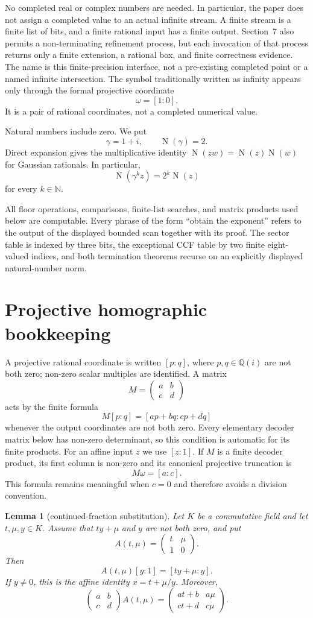 \documentclass[10pt]{article}
\newtheorem{lemma}[theorem]{Lemma}
\theoremstyle{definition}
\theoremstyle{remark}
\newcommand{\N}{\mathbb{N}}
\newcommand{\Qi}{\mathbb{Q}(i)}
\newcommand{\Norm}{\operatorname{N}}
\newcommand{\Proj}[2]{[#1:#2]}
\newcommand{\mat}[4]{\begin{pmatrix}#1&#2\\#3&#4\end{pmatrix}}
\begin{document}
No completed real or complex numbers are needed.  In particular, the paper does not assign a completed value to an actual infinite stream.  A finite stream is a finite list of bits, and a finite rational input has a finite output.  Section~7 also permits a non-terminating refinement process, but each invocation of that process returns only a finite extension, a rational box, and finite correctness evidence.  The name is this finite-precision interface, not a pre-existing completed point or a named infinite intersection.  The symbol traditionally written as infinity appears only through the formal projective coordinate
\[
 \omega=\Proj{1}{0}.
\]
It is a pair of rational coordinates, not a completed numerical value.

Natural numbers include zero.  We put
\[
 \gamma=1+i,\qquad \Norm(\gamma)=2.
\]
Direct expansion gives the multiplicative identity $\Norm(zw)=\Norm(z)\Norm(w)$ for Gaussian rationals.  In particular,
\[
 \Norm(\gamma^kz)=2^k\Norm(z)
\]
for every $k\in\N$.

All floor operations, comparisons, finite-list searches, and matrix products used below are computable.  Every phrase of the form ``obtain the exponent'' refers to the output of the displayed bounded scan together with its proof.  The sector table is indexed by three bits, the exceptional CCF table by two finite eight-valued indices, and both termination theorems recurse on an explicitly displayed natural-number norm.

\section{Projective homographic bookkeeping}

A projective rational coordinate is written $\Proj{p}{q}$, where $p,q\in\Qi$ are not both zero; non-zero scalar multiples are identified.  A matrix
\[
 M=\mat{a}{b}{c}{d}
\]
acts by the finite formula
\[
 M\Proj{p}{q}=\Proj{ap+bq}{cp+dq}
\]
whenever the output coordinates are not both zero.  Every elementary decoder matrix below has non-zero determinant, so this condition is automatic for its finite products.  For an affine input $z$ we use $\Proj{z}{1}$.  If $M$ is a finite decoder product, its first column is non-zero and its canonical projective truncation is
\[
 M\omega=\Proj{a}{c}.
\]
This formula remains meaningful when $c=0$ and therefore avoids a division convention.

\begin{lemma}[continued-fraction substitution]\label{lem:cf-substitution}
Let $K$ be a commutative field and let $t,\mu,y\in K$.  Assume that $ty+\mu$ and $y$ are not both zero, and put
\[
 A(t,\mu)=\mat{t}{\mu}{1}{0}.
\]
Then
\[
 A(t,\mu)\Proj{y}{1}=\Proj{ty+\mu}{y}.
\]
If $y\ne0$, this is the affine identity $x=t+\mu/y$.  Moreover,
\[
 \mat{a}{b}{c}{d}A(t,\mu)
 =\mat{at+b}{a\mu}{ct+d}{c\mu}.
\]
\end{lemma}
\end{document}
